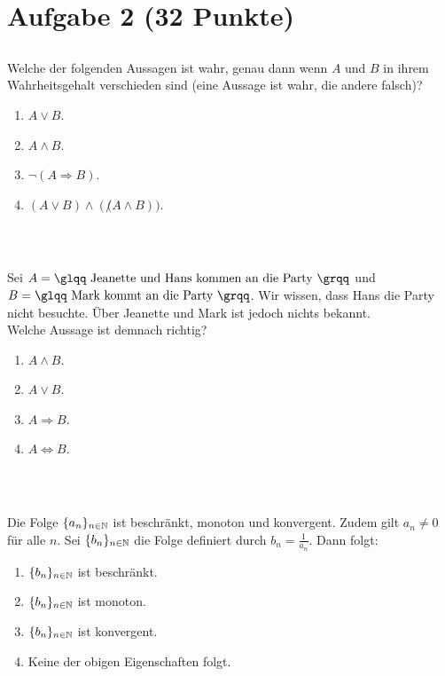 \section*{Aufgabe 2 (32 Punkte)}
\vspace{0.4cm}

\subsection*{}
Welche der folgenden Aussagen ist wahr, genau dann wenn $ A $ und $ B $ in ihrem Wahrheitsgehalt verschieden sind (eine Aussage ist wahr, die andere falsch)?
 \renewcommand{\labelenumi}{(\alph{enumi})}
\begin{enumerate}
\item $ A \vee B $.
\item $ A \wedge B $.
\item $ \neg (A \Rightarrow B) $.
\item $ (A \vee B) \wedge (\not(A \wedge B)) $.
\end{enumerate}
\ \\
\subsection*{}
Sei $ A = \textrm{\glqq Jeanette und Hans kommen an die Party \grqq} $
und $ B = \textrm{\glqq Mark kommt an die Party \grqq}  $.
Wir wissen, dass Hans die Party nicht besuchte.
Über Jeanette und Mark ist jedoch nichts bekannt.\\
Welche Aussage ist demnach richtig?
\renewcommand{\labelenumi}{(\alph{enumi})}
\begin{enumerate}
\item $ A \wedge B $.
\item $ A \vee B $.
\item $ A \Rightarrow B $.
\item $ A \Leftrightarrow B $.
\end{enumerate}
\ \\
\subsection*{}
Die Folge $ \{ a_n \}_{n \in \mathbb{N}} $ ist beschränkt, monoton und konvergent.
Zudem gilt $ a_n \neq 0  $ für alle $ n $.
Sei $ \{b_n\}_{n \in \mathbb{N}} $ die Folge definiert durch $ b_n = \frac{1}{a_n} $.
Dann folgt:
\renewcommand{\labelenumi}{(\alph{enumi})}
\begin{enumerate}
\item 
$ \{b_n \}_{n \in \mathbb{N}} $ ist beschränkt.
\item 
$ \{b_n\}_{n \in \mathbb{N}} $ ist monoton.
\item 
$ \{b_n\}_{n \in \mathbb{N}} $ ist konvergent.
\item
Keine der obigen Eigenschaften folgt.
\end{enumerate}
\ \\

